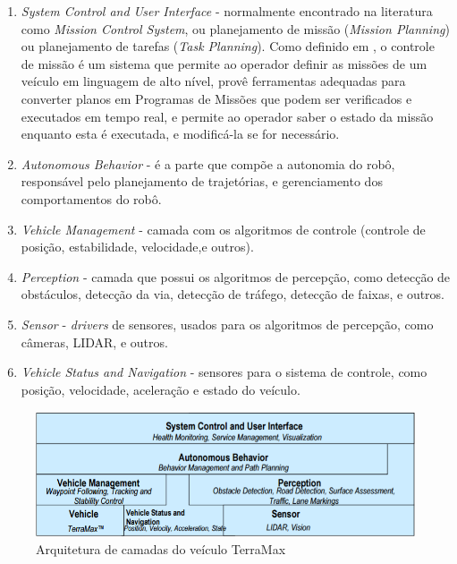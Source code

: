 \begin{enumerate}
  \item \textit{System Control and User Interface} - normalmente encontrado na
  literatura como \textit{Mission Control System}, ou planejamento de
missão (\textit{Mission Planning}) ou planejamento de tarefas (\textit{Task
Planning}). Como definido em \cite{fryxell1996navigation}, o controle de
missão é um sistema que permite ao operador definir as missões de um veículo em
linguagem de alto nível, provê ferramentas adequadas para converter planos em
Programas de Missões que podem ser verificados e executados em tempo real, e
permite ao operador saber o estado da missão enquanto esta é executada, e
modificá-la se for necessário.

  \item \textit{Autonomous Behavior} - é a parte que compõe a autonomia do robô,
  responsável pelo planejamento de trajetórias, e gerenciamento dos
  comportamentos do robô.
  
  \item \textit{Vehicle Management} - camada com os algoritmos de controle
  (controle de posição, estabilidade, velocidade,e  outros).
  
  \item \textit{Perception} - camada que possui os algoritmos de percepção, como
  detecção de obstáculos, detecção da via, detecção de tráfego, detecção de
  faixas, e outros.
  
  \item \textit{Sensor} - \textit{drivers} de sensores, usados para os
  algoritmos de percepção, como câmeras, LIDAR, e outros.
  
  \item \textit{Vehicle Status and Navigation} - sensores para o sistema de
  controle, como posição, velocidade, aceleração e estado do veículo.
\end{enumerate}
 
\begin{figure}[!ht]
\centering
\includegraphics[width=\columnwidth]{figs/camadas.jpg}
\caption{Arquitetura de camadas do veículo TerraMax}
\label{fig:camadas}
\end{figure}

